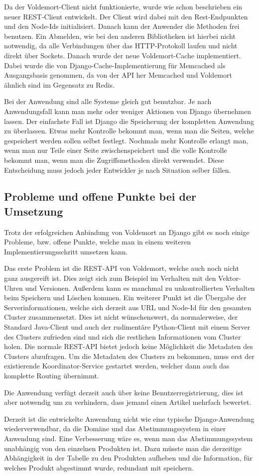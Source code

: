 Da der Voldemort-Client nicht funktionierte, wurde wie schon beschrieben ein
neuer \gls{REST}-Client entwickelt. Der Client wird dabei mit den Rest-Endpunkten und
den Node-Ids initialisiert. Danach kann der Anwender die Methoden frei benutzen.
Ein Abmelden, wie bei den anderen Bibliotheken ist hierbei nicht notwendig, da
alle Verbindungen über das HTTP-Protokoll laufen und nicht direkt über Sockets.
Danach wurde der neue Voldemort-Cache implementiert. Dabei wurde die von
Django-Cache-Implementierung für Memcached als Ausgangsbasis genommen, da von
der API her Memcached und Voldemort ähnlich sind im Gegensatz zu Redis.

Bei der Anwendung sind alle Systeme gleich gut benutzbar. Je nach Anwendungsfall
kann man mehr oder weniger Aktionen von Django übernehmen lassen. Der einfachste
Fall ist Django die Speicherung der kompletten Anwendung zu überlassen. Etwas
mehr Kontrolle bekommt man, wenn man die Seiten, welche gespeichert werden
sollen selbst festlegt. Nochmals mehr Kontrolle erlangt man, wenn man nur Teile
einer Seite zwischenspeichert und die volle Kontrolle bekommt man, wenn man die
Zugriffsmethoden direkt verwendet. Diese Entscheidung muss jedoch jeder
Entwickler je nach Situation selber fällen.

\subsection{Probleme und offene Punkte bei der Umsetzung}
Trotz der erfolgreichen Anbindung von Voldemort an Django gibt es noch einige
Probleme, bzw. offene Punkte, welche man in einem weiteren
Implementierungsschritt umsetzen kann.

Das erste Problem ist die \gls{REST}-API von Voldemort, welche auch noch nicht
ganz ausgereift ist. Dies zeigt sich zum Beispiel im Verhalten mit den
Vektor-Uhren und Versionen. Außerdem kann es manchmal zu unkontrollierten
Verhalten beim  Speichern und Löschen kommen. Ein weiterer Punkt ist die Übergabe
der Serverinformationen, welche sich derzeit aus URL und Node-Id für den gesamten
Cluster zusammensetzt. Dies ist nicht wünschenswert, da normalerweise, der
Standard Java-Client und auch der rudimentäre Python-Client mit einem Server
des Clusters zufrieden sind und sich die restlichen Informationen vom Cluster
holen. Die normale REST-API bietet jedoch keine Möglichkeit die Metadaten des
Clusters abzufragen. Um die Metadaten des Clusters zu bekommen, muss erst der
existierende Koordinator-Service gestartet werden, welcher dann auch das
komplette Routing übernimmt.

Die Anwendung verfügt derzeit auch über keine Benutzerregistrierung, dies ist
aber notwendig um zu verhindern, dass jemand einen Artikel mehrfach bewertet.

Derzeit ist die entwickelte Anwendung nicht wie eine typische Django-Anwendung
wiederverwendbar, da die Domäne und das Abstimmungssystem in einer Anwendung sind.
Eine Verbesserung wäre es, wenn man das Abstimmungssystem unabhängig von den
einzelnen Produkten ist. Dazu müsste man die derzeitige Abhängigkeit in der
Tabelle zu den Produkten aufheben und die Information, für welches Produkt
abgestimmt wurde, redundant mit speichern.
